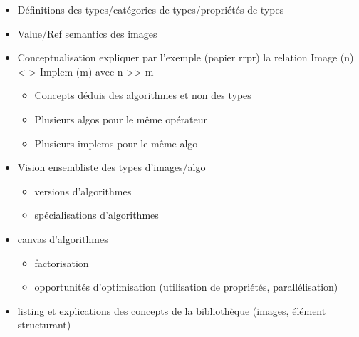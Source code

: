 \begin{itemize}
  \item Définitions des types/catégories de types/propriétés de types
  \item Value/Ref semantics des images
  \item Conceptualisation expliquer par l'exemple (papier rrpr) la relation Image (n) <-> Implem (m) avec n >> m
        \begin{itemize}
          \item Concepts déduis des algorithmes et non des types
          \item Plusieurs algos pour le même opérateur
          \item Plusieurs implems pour le même algo
        \end{itemize}
  \item Vision ensembliste des types d'images/algo
        \begin{itemize}
          \item versions d'algorithmes
          \item spécialisations d'algorithmes
        \end{itemize}
  \item canvas d'algorithmes
        \begin{itemize}
          \item factorisation
          \item opportunités d'optimisation (utilisation de propriétés, parallélisation)
        \end{itemize}
  \item listing et explications des concepts de la bibliothèque (images, élément structurant)
\end{itemize}